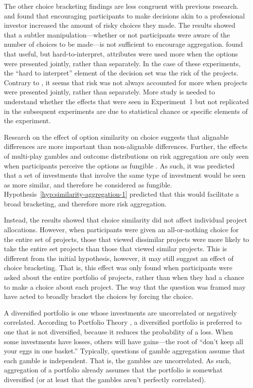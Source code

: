 \documentclass[a4paper, nobind, dvipsnames]{templates/ociamthesis}
\theoremstyle{definition}
\theoremstyle{definition}
\theoremstyle{definition}
\theoremstyle{definition}
\theoremstyle{remark}
\begin{document}
The other choice bracketing findings are less congruent with previous research.
\textcite{sokolhessner2009} and \textcite{sokolhessner2012} found that encouraging participants to
make decisions akin to a professional investor increased the amount of risky
choices they made. The results showed that a subtler manipulation---whether or
not participants were aware of the number of choices to be made---is not
sufficient to encourage aggregation. \textcite{hsee1999} found that useful, but
hard-to-interpret, attributes were used more when the options were presented
jointly, rather than separately. In the case of these experiments, the ``hard to
interpret'' element of the decision set was the risk of the projects. Contrary to
\textcite{hsee1999}, it seems that risk was not always accounted for more when projects
were presented jointly, rather than separately. More study is needed to
understand whether the effects that were seen in Experiment~1 but not replicated
in the subsequent experiments are due to statistical chance or specific elements
of the experiment.

Research on the effect of option similarity on choice \autocite[e.g.,][]{markman1995}
suggests that alignable differences are more important than non-alignable
differences. Further, the effects of multi-play gambles and outcome
distributions on risk aggregation are only seen when participants perceive the
options as fungible \autocite[e.g.,][]{dekay2005}. As such, it was predicted that a set of
investments that involve the same type of investment would be seen as more
similar, and therefore be considered as fungible.
Hypothesis~\ref{hyp:similarity-aggregation-1} predicted that this would
facilitate a broad bracketing, and therefore more risk aggregation.

Instead, the results showed that choice similarity did not affect individual
project allocations. However, when participants were given an all-or-nothing
choice for the entire set of projects, those that viewed dissimilar projects
were more likely to take the entire set projects than those that viewed similar
projects. This is different from the initial hypothesis, however, it may still
suggest an effect of choice bracketing. That is, this effect was only found when
participants were asked about the entire portfolio of projects, rather than when
they had a chance to make a choice about each project. The way that the question
was framed may have acted to broadly bracket the choices by forcing the choice.

A diversified portfolio is one whose investments are uncorrelated or negatively
correlated. According to Portfolio Theory \autocite{markowitz1952}, a diversified
portfolio is preferred to one that is not diversified, because it reduces the
probability of a loss. When some investments have losses, others will have
gains---the root of ``don't keep all your eggs in one basket.'' Typically,
questions of gamble aggregation assume that each gamble is independent. That is,
the gambles are uncorrelated. As such, aggregation of a portfolio already
assumes that the portfolio is somewhat diversified (or at least that the gambles
aren't perfectly correlated).
\end{document}
